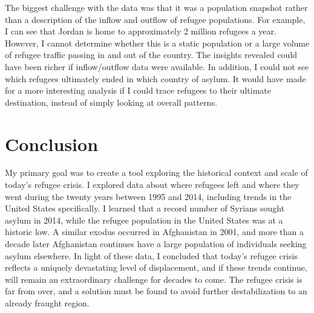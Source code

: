 \documentclass{article}
\begin{document}
\noindent The biggest challenge with the data was that it was a population snapshot rather than a description of the inflow and outflow of refugee populations. For example, I can see that Jordan is home to approximately 2 million refugees a year. However, I cannot determine whether this is a static population or a large volume of refugee traffic passing in and out of the country. The insights revealed could have been richer if inflow/outflow data were available. In addition, I could not see which refugees ultimately ended in which country of asylum. It would have made for a more interesting analysis if I could trace refugees to their ultimate destination, instead of simply looking at overall patterns. 

\section{Conclusion}

\noindent My primary goal was to create a tool exploring the historical context and scale of today's refugee crisis. I explored data about where refugees left and where they went during the twenty years between 1995 and 2014, including trends in the United States specifically. I learned that a record number of Syrians sought asylum in 2014, while the refugee population in the United States was at a historic low. A similar exodus occurred in Afghanistan in 2001, and more than a decade later Afghanistan continues have a large population of individuals seeking asylum elsewhere. In light of these data, I concluded that today's refugee crisis reflects a uniquely devastating level of displacement, and if these trends continue, will remain an extraordinary challenge for decades to come. The refugee crisis is far from over, and a solution must be found to avoid further destabilization to an already fraught region.
\end{document}
